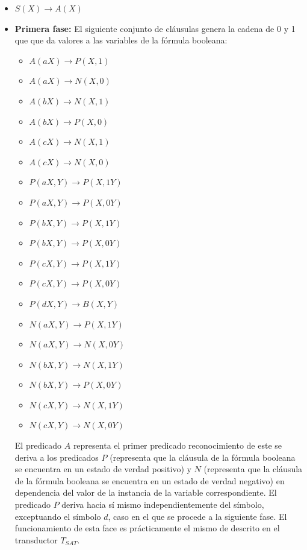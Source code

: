 \begin{itemize}
    \item $S(X)\to A(X)$
    \item \textbf{Primera fase:} El siguiente conjunto de cláusulas genera la cadena de 0 y 1 que que da valores a las variables de la
          fórmula booleana:
          \begin{multicols}{2}
              \begin{itemize}
                  \item $A(aX)\to P(X,1)$
                  \item $A(aX)\to N(X,0)$
                  \item $A(bX)\to N(X,1)$
                  \item $A(bX)\to P(X,0)$
                  \item $A(cX)\to N(X,1)$
                  \item $A(cX)\to N(X,0)$
                        
                  \item $P(aX,Y)\to P(X,1Y)$
                  \item $P(aX,Y)\to P(X,0Y)$
                  \item $P(bX,Y)\to P(X,1Y)$
                  \item $P(bX,Y)\to P(X,0Y)$
                  \item $P(cX,Y)\to P(X,1Y)$
                  \item $P(cX,Y)\to P(X,0Y)$
                  \item $P(dX,Y)\to B(X,Y)$
                        
                  \item $N(aX,Y)\to P(X,1Y)$
                  \item $N(aX,Y)\to N(X,0Y)$
                  \item $N(bX,Y)\to N(X,1Y)$
                  \item $N(bX,Y)\to P(X,0Y)$
                  \item $N(cX,Y)\to N(X,1Y)$
                  \item $N(cX,Y)\to N(X,0Y)$
              \end{itemize}
          \end{multicols}
          
          El predicado $A$ representa el primer predicado reconocimiento de este se deriva a los predicados $P$
          (representa que la cláusula de la fórmula booleana se encuentra en un estado de verdad positivo) 
          y $N$ (representa que la cláusula de la fórmula booleana se encuentra en un estado de verdad negativo)
          en dependencia del valor de la instancia de la variable correspondiente. El predicado $P$ deriva hacia
          sí mismo independientemente del símbolo, exceptuando el símbolo $d$, caso en el que se procede a la siguiente
          fase.
          El funcionamiento de esta face es prácticamente el mismo de descrito en el transductor $T_{SAT}$.
          

\end{itemize}
